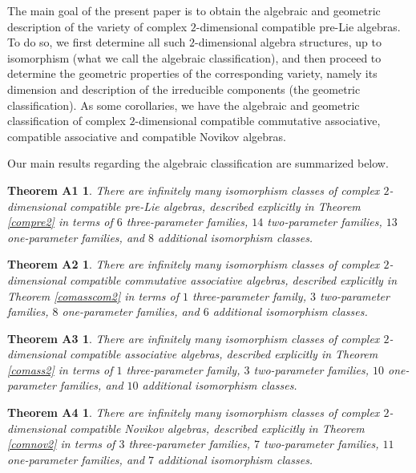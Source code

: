 \documentclass[pdftex]{sigma}
\numberwithin{equation}{section}
\newtheorem*{theoremA1}{Theorem A1}
\newtheorem*{theoremA2}{Theorem A2}
\newtheorem*{theoremA3}{Theorem A3}
\newtheorem*{theoremA4}{Theorem A4}
\begin{document}
The main goal of the present paper is to obtain the algebraic and geometric description of the variety of complex $2$-dimensional compatible pre-Lie algebras. To do so, we first determine all such $2$-dimensional algebra structures, up to isomorphism (what we call the algebraic classification), and then proceed to determine the geometric properties of the corresponding variety, namely its dimension and description of the irreducible components (the geometric classification).
As some corollaries, we have the algebraic and geometric classification of complex $2$-dimensional
compatible commutative associative,
compatible associative
and compatible Novikov algebras.

Our main results regarding the algebraic classification are summarized below.

\begin{theoremA1}
There are infinitely many isomorphism classes of complex
$2$-dimensional compatible pre-Lie algebras, described explicitly in
 Theorem {\rm\ref{compre2}}
 in terms of
$6$ three-parameter families,
$14$ two-parameter families,
$13$ one-parameter families,
and
$8$ additional isomorphism classes.
\end{theoremA1}

\begin{theoremA2}
There are infinitely many isomorphism classes of complex
$2$-dimensional compatible commutative associative algebras, described explicitly in
 Theorem {\rm\ref{comasscom2}}
 in terms of
$1$ three-parameter family,
$3$ two-parameter families,
$8$ one-parameter families,
and
$6$ additional isomorphism classes.
\end{theoremA2}

\begin{theoremA3}
There are infinitely many isomorphism classes of complex
$2$-dimensional compatible associative algebras, described explicitly in
 Theorem {\rm\ref{comass2}}
 in terms of
$1$ three-parameter family,
$3$ two-parameter families,
$10$ one-parameter families,
and
$10$ additional isomorphism classes.
\end{theoremA3}

\begin{theoremA4}
There are infinitely many isomorphism classes of complex
$2$-dimensional compatible Novikov algebras, described explicitly in
 Theorem {\rm\ref{comnov2}}
 in terms of
$3$ three-parameter families,
$7$ two-parameter families,
$11$ one-parameter families,
and
$7$ additional isomorphism classes.
\end{theoremA4}
\end{document}
